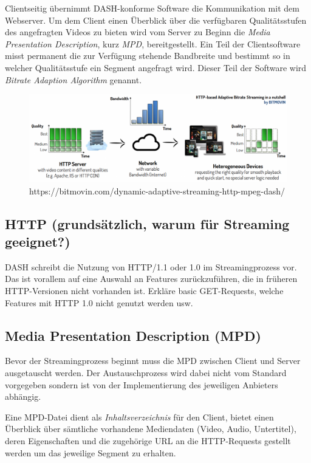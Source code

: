 \documentclass[paper = a4, fontsize = 12pt, parskip = half]{scrartcl} %
\begin{document}
Clientseitig übernimmt DASH-konforme Software die Kommunikation mit dem Webserver. Um dem Client einen Überblick über die verfügbaren Qualitätsstufen des angefragten Videos zu bieten wird vom Server zu Beginn die \textit{Media Presentation Description}, kurz \textit{MPD}, bereitgestellt. Ein Teil der Clientsoftware misst permanent die zur Verfügung stehende Bandbreite und bestimmt so in welcher Qualitätsstufe ein Segment angefragt wird. Dieser Teil der Software wird \textit{Bitrate Adaption Algorithm} genannt. 

\begin{center}
    \begin{figure}
        \includegraphics[width=14cm]{images/adaptive-streaming-basic.png}
        \caption{https://bitmovin.com/dynamic-adaptive-streaming-http-mpeg-dash/}
    \end{figure}
\end{center}


\subsection{HTTP (grundsätzlich, warum für Streaming geeignet?)}
DASH schreibt die Nutzung von HTTP/1.1 oder 1.0 im Streamingprozess vor. Das ist vorallem auf eine Auswahl an Features zurückzuführen, die in früheren HTTP-Versionen nicht vorhanden ist. Erkläre basic GET-Requests, welche Features mit HTTP 1.0 nicht genutzt werden usw.

\subsection{Media Presentation Description (MPD)}
Bevor der Streamingprozess beginnt muss die MPD zwischen Client und Server ausgetauscht werden. Der Austauschprozess wird dabei nicht vom Standard vorgegeben sondern ist von der Implementierung des jeweiligen Anbieters abhängig.

Eine MPD-Datei dient als \textit{Inhaltsverzeichnis} für den Client, bietet einen Überblick über sämtliche vorhandene Mediendaten (Video, Audio, Untertitel), deren Eigenschaften und die zugehörige URL an die HTTP-Requests gestellt werden um das jeweilige Segment zu erhalten.
\end{document}
